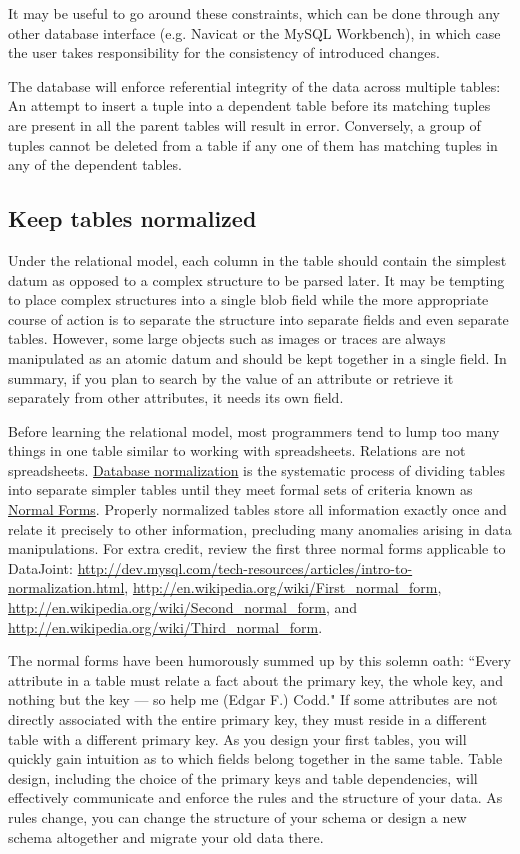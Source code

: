 \documentclass[10pt]{article}
\begin{document}
It may be useful to go around these constraints, which can be done through any other database interface (e.g. Navicat or the MySQL Workbench), in which case the user takes responsibility for the consistency of introduced changes. 

The database will enforce referential integrity of the data across multiple tables:  An attempt to insert a tuple into a dependent table before its matching tuples are present in all the parent tables will result in error.  Conversely, a group of tuples cannot be deleted from a table if any one of them has matching tuples in any of the dependent tables.


\subsection{Keep tables normalized}
Under the relational model, each column in the table should contain the simplest datum as opposed to a complex structure to be parsed later.  It may be tempting to place complex structures into a single blob field while the more appropriate course of action is to separate the structure into separate fields and even separate tables.   However, some large objects such as images or traces are always manipulated as an atomic datum and should be kept together in a single field.  In summary, if you plan to search by the value of an attribute or retrieve it separately from other attributes, it needs its own field.

Before learning the relational model, most programmers tend to lump too many things in one table similar to working with spreadsheets.  Relations are not spreadsheets.  \href{http://en.wikipedia.org/wiki/Database_normalization}{Database normalization} is the systematic process of dividing tables into separate simpler tables until they meet formal sets of criteria known as \href{http://en.wikipedia.org/wiki/Database_normalization}{Normal Forms}. Properly normalized tables store all information exactly once and relate it precisely to other information, precluding many anomalies arising in data manipulations.  For extra credit, review the first three normal forms applicable to DataJoint: \url{http://dev.mysql.com/tech-resources/articles/intro-to-normalization.html}, \url{http://en.wikipedia.org/wiki/First_normal_form}, \url{http://en.wikipedia.org/wiki/Second_normal_form}, and \url{http://en.wikipedia.org/wiki/Third_normal_form}.

The normal forms have been humorously summed up by this solemn oath: ``Every attribute in a table must relate a fact about the primary key, the whole key, and nothing but the key --- so help me (Edgar F.) Codd."  If some attributes are not directly associated with the entire primary key, they must reside in a different table with a different primary key.  As you design your first tables, you will quickly gain intuition as to which fields belong together in the same table.  Table design, including the choice of the primary keys and table dependencies, will effectively communicate and enforce the rules and the structure of your data.  As rules change, you can change the structure of your schema or design a new schema altogether and migrate your old data there.
\end{document}
